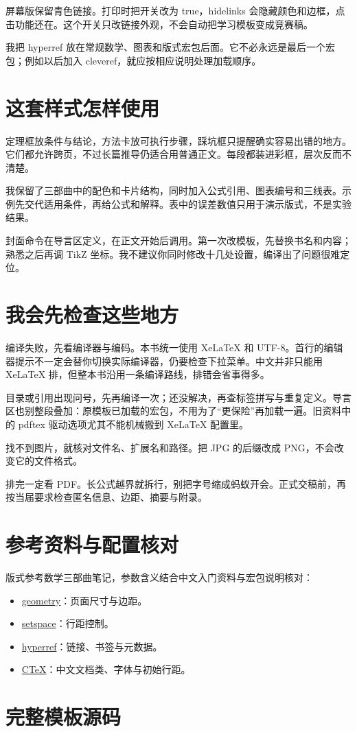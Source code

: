 屏幕版保留青色链接。打印时把开关改为 true，hidelinks 会隐藏颜色和边框，点击功能还在。这个开关只改链接外观，不会自动把学习模板变成竞赛稿。

我把 hyperref 放在常规数学、图表和版式宏包后面。它不必永远是最后一个宏包；例如以后加入 cleveref，就应按相应说明处理加载顺序。

\section{这套样式怎样使用}

定理框放条件与结论，方法卡放可执行步骤，踩坑框只提醒确实容易出错的地方。它们都允许跨页，不过长篇推导仍适合用普通正文。每段都装进彩框，层次反而不清楚。

我保留了三部曲中的配色和卡片结构，同时加入公式引用、图表编号和三线表。示例先交代适用条件，再给公式和解释。表中的误差数值只用于演示版式，不是实验结果。

封面命令在导言区定义，在正文开始后调用。第一次改模板，先替换书名和内容；熟悉之后再调 TikZ 坐标。我不建议你同时修改十几处设置，编译出了问题很难定位。

\section{我会先检查这些地方}

编译失败，先看编译器与编码。本书统一使用 XeLaTeX 和 UTF-8。首行的编辑器提示不一定会替你切换实际编译器，仍要检查下拉菜单。中文并非只能用 XeLaTeX 排，但整本书沿用一条编译路线，排错会省事得多。

目录或引用出现问号，先再编译一次；还没解决，再查标签拼写与重复定义。导言区也别整段叠加：原模板已加载的宏包，不用为了“更保险”再加载一遍。旧资料中的 pdftex 驱动选项尤其不能机械搬到 XeLaTeX 配置里。

找不到图片，就核对文件名、扩展名和路径。把 JPG 的后缀改成 PNG，不会改变它的文件格式。

排完一定看 PDF。长公式越界就拆行，别把字号缩成蚂蚁开会。正式交稿前，再按当届要求检查匿名信息、边距、摘要与附录。

\section*{参考资料与配置核对}

版式参考数学三部曲笔记，参数含义结合中文入门资料与宏包说明核对：

\begin{itemize}
\item \href{https://ctan.org/pkg/geometry}{geometry}：页面尺寸与边距。
\item \href{https://ctan.org/pkg/setspace}{setspace}：行距控制。
\item \href{https://ctan.org/pkg/hyperref}{hyperref}：链接、书签与元数据。
\item \href{https://ctan.org/pkg/ctex}{CTeX}：中文文档类、字体与初始行距。
\end{itemize}

\section*{完整模板源码}\label{sec:golden-template-source}
